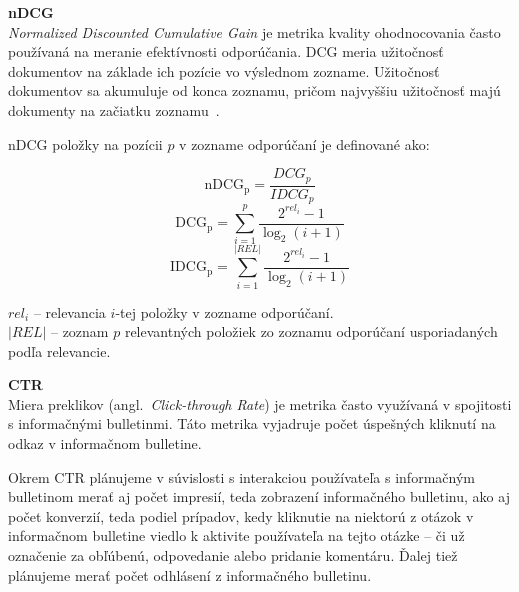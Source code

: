 \textbf{nDCG}\\
\textit{Normalized Discounted Cumulative Gain} je metrika kvality ohodnocovania často používaná na meranie efektívnosti
odporúčania. DCG meria užitočnosť dokumentov na základe ich pozície vo výslednom zozname. Užitočnosť dokumentov sa akumuluje
od konca zoznamu, pričom najvyššiu užitočnosť majú dokumenty na začiatku zoznamu~\cite{Jrvelin2002}.

nDCG položky na pozícii $p$ v zozname odporúčaní je definované ako:

$$\mathrm{nDCG_{p}} = \frac{DCG_{p}}{IDCG_{p}}$$
$$\mathrm{DCG_{p}} = \sum_{i=1}^{p} \frac{ 2^{rel_{i}} - 1 }{ \log_{2}(i+1)}$$
$$\mathrm{IDCG_{p}} = \sum_{i=1}^{|REL|} \frac{ 2^{rel_{i}} - 1 }{ \log_{2}(i+1)}$$
\begin{adjustwidth}{1cm}{1cm}
$rel_i$ -- relevancia $i$-tej položky v zozname odporúčaní.\\
$|REL|$ -- zoznam $p$ relevantných položiek zo zoznamu odporúčaní usporiadaných podľa relevancie.
\end{adjustwidth}

\textbf{CTR}\\
Miera preklikov (angl.~\emph{Click-through Rate}) je metrika často využívaná v spojitosti s informačnými bulletinmi.
Táto metrika vyjadruje počet úspešných kliknutí na odkaz v informačnom bulletine.

Okrem CTR plánujeme v súvislosti s interakciou používateľa s informačným bulletinom merať aj počet impresií,
teda zobrazení informačného bulletinu, ako aj počet konverzií, teda podiel prípadov, kedy kliknutie na niektorú z otázok
v informačnom bulletine viedlo k aktivite používateľa na tejto otázke -- či už označenie za obľúbenú,
odpovedanie alebo pridanie komentáru. Ďalej tiež plánujeme merať počet odhlásení z informačného bulletinu.
